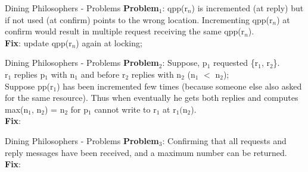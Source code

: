 \documentclass[10pt]{beamer}
\begin{document}
\begin{frame}{Dining Philosophers - Problems}
	\textbf{Problem$_1$}: qpp(r$_n$) is incremented (at reply) but if not used (at confirm) points to the wrong location. Incrementing qpp(r$_n$) at confirm would result in multiple request receiving the same qpp(r$_n$). \vspace{.5cm} \\ \textbf{Fix}: update qpp(r$_n$) again at locking;
\end{frame}

\begin{frame}{Dining Philosophers - Problems}
	\textbf{Problem$_2$}: Suppose, p$_1$ requested \{r$_1$, r$_2$\}. \\ r$_1$ replies p$_1$ with n$_1$ and before r$_2$ replies with n$_2$ (n$_1$ $<$ n$_2$); \\
	 Suppose pp(r$_1$) has been incremented few times (because someone else also asked for the same resource). Thus when eventually he gets both replies and computes max(n$_1$, n$_2$) = n$_2$ for p$_1$ cannot write to r$_1$ at r$_1($n$_2$).   \\ 
	
	\textbf{Fix}: 
\end{frame}

\begin{frame}{Dining Philosophers - Problems}
	\textbf{Problem$_3$}: Confirming that all requests and reply messages have been received, and a maximum number can be returned. \vspace{.5cm} \\ 
	
	\textbf{Fix}: 
\end{frame}



	
\end{document}
